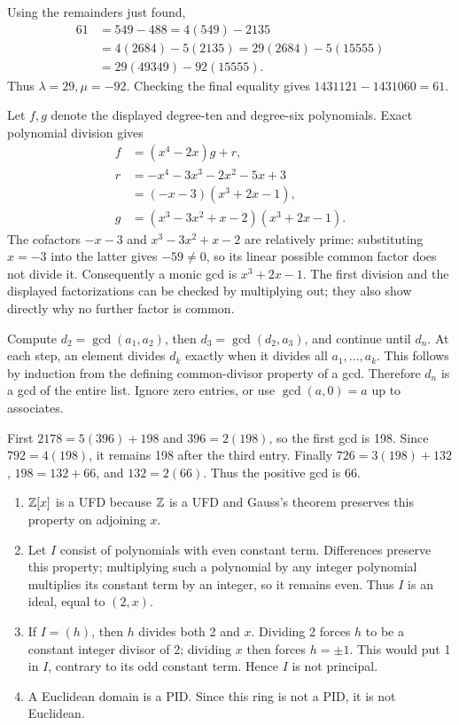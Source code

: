 Using the remainders just found,
\begin{align*}
61&=549-488=4(549)-2135\\
&=4(2684)-5(2135)=29(2684)-5(15555)\\
&=29(49349)-92(15555).
\end{align*}
Thus $\lambda=29,\mu=-92$. Checking the final equality gives $1431121-1431060=61$.

Let $f,g$ denote the displayed degree-ten and degree-six polynomials. Exact polynomial division gives
\begin{align*}
f&=(x^4-2x)g+r,\\
r&=-x^4-3x^3-2x^2-5x+3\\
 & =(-x-3)(x^3+2x-1),\\
g&=(x^3-3x^2+x-2)(x^3+2x-1).
\end{align*}
The cofactors $-x-3$ and $x^3-3x^2+x-2$ are relatively prime: substituting $x=-3$ into the latter gives $-59\ne0$, so its linear possible common factor does not divide it. Consequently a monic gcd is $x^3+2x-1$. The first division and the displayed factorizations can be checked by multiplying out; they also show directly why no further factor is common.

Compute $d_2=\gcd(a_1,a_2)$, then $d_3=\gcd(d_2,a_3)$, and continue until $d_n$. At each step, an element divides $d_k$ exactly when it divides all $a_1,\ldots,a_k$. This follows by induction from the defining common-divisor property of a gcd. Therefore $d_n$ is a gcd of the entire list. Ignore zero entries, or use $\gcd(a,0)=a$ up to associates.

First $2178=5(396)+198$ and $396=2(198)$, so the first gcd is 198. Since $792=4(198)$, it remains 198 after the third entry. Finally $726=3(198)+132$, $198=132+66$, and $132=2(66)$. Thus the positive gcd is 66.

\begin{enumerate}[label=(\alph*)]
\item $\mathbb{Z}[x]$ is a UFD because $\mathbb{Z}$ is a UFD and Gauss's theorem preserves this property on adjoining $x$.
\item Let $I$ consist of polynomials with even constant term. Differences preserve this property; multiplying such a polynomial by any integer polynomial multiplies its constant term by an integer, so it remains even. Thus $I$ is an ideal, equal to $(2,x)$.
\item If $I=(h)$, then $h$ divides both 2 and $x$. Dividing 2 forces $h$ to be a constant integer divisor of 2; dividing $x$ then forces $h=\pm1$. This would put 1 in $I$, contrary to its odd constant term. Hence $I$ is not principal.
\item A Euclidean domain is a PID. Since this ring is not a PID, it is not Euclidean.
\end{enumerate}

